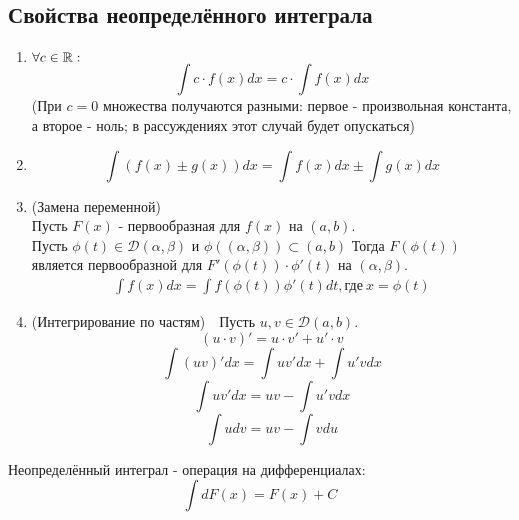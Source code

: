 \subsection{Свойства неопределённого интеграла}
\begin{enumerate}
    \item $\forall c \in \mathbb{R}: $
    \[\int c\cdot f(x)dx = c\cdot \int f(x)dx\]
    (При $c = 0$ множества получаются разными: первое - произвольная константа, а второе - ноль; в рассуждениях этот случай будет опускаться)
    \item \[\int (f(x) \pm g(x))dx = \int f(x) dx \pm \int g(x) dx\]
    \item (Замена переменной)\\
    Пусть $F(x)$ - первообразная для $f(x)$ на $(a, b)$.\\
    Пусть $\phi(t) \in \mathcal{D}(\alpha, \beta)$ и $\phi((\alpha, \beta)) \subset (a, b)$
    Тогда $F(\phi(t))$ является первообразной для $F'(\phi(t))\cdot\phi'(t)$ на $(\alpha, \beta)$.
    \begin{align*}
        \int f(x) dx = \int f(\phi(t))\phi'(t) dt ,\text{где} \ x = \phi(t)
    \end{align*}
    \item (Интегрирование по частям)\ \ Пусть $u,v \in \mathcal{D}(a, b)$.
    \[(u\cdot v)' = u\cdot v' + u'\cdot v\]
    \[\int(uv)'dx = \int uv' dx + \int u'v dx\]
    \[\int uv' dx = uv - \int u'v dx\]
    \[\int udv = uv - \int vdu\]
\end{enumerate}
\begin{comm}
    Неопределённый интеграл - операция на дифференциалах: 
    \[\int dF(x) = F(x) + C\]
\end{comm}
